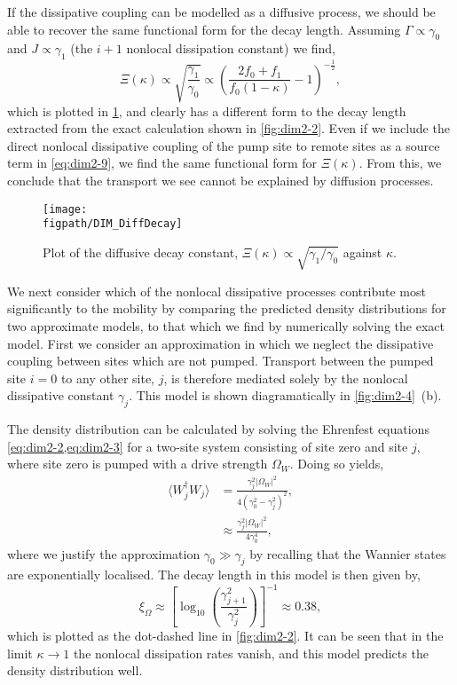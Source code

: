 If the dissipative coupling can be modelled as a diffusive process, we should be able to recover the same functional form for the decay length. Assuming \(\Gamma \propto \gamma_{0}\) and \(J \propto \gamma_{1}\) (the \(i+1\) nonlocal dissipation constant) we find,
\begin{equation}
	\Xi(\kappa) \propto \sqrt{\frac{\gamma_{1}}{\gamma_{0}}} \propto \left(\frac{2f_{0} + f_{1}}{f_{0}(1-\kappa)} - 1\right)^{-\frac{1}{2}},
	\label{eq:dim2-11}
\end{equation}
which is plotted in \cref{fig:dim2-5}, and clearly has a different form to the decay length extracted from the exact calculation shown in \cref{fig:dim2-2}. Even if we include the direct nonlocal dissipative coupling of the pump site to remote sites as a source term in \cref{eq:dim2-9}, we find the same functional form for \(\Xi(\kappa)\). From this, we conclude that the transport we see cannot be explained by diffusion processes.

\begin{figure}[ht!]
\centering 
\texttt{[image: \\figpath/DIM\_DiffDecay]}
\caption{\label{fig:dim2-5}Plot of the diffusive decay constant, \(\Xi(\kappa) \propto \sqrt{\gamma_{1}/\gamma_{0}}\) against \(\kappa\).}
\end{figure}

We next consider which of the nonlocal dissipative processes contribute most significantly to the mobility by comparing the predicted density distributions for two approximate models, to that which we find by numerically solving the exact model. First we consider an approximation in which we neglect the dissipative coupling between sites which are not pumped. Transport between the pumped site \(i=0\) to any other site, \(j\), is therefore mediated solely by the nonlocal dissipative constant \(\gamma_{j}\). This model is shown diagramatically in \cref{fig:dim2-4}~(b). 

The density distribution can be calculated by solving the Ehrenfest equations \cref{eq:dim2-2,eq:dim2-3} for a two-site system consisting of site zero and site \(j\), where site zero is pumped with a drive strength \(\Omega_{W}\). Doing so yields,
\begin{align}
	\langle W_{j}^{\dagger}W_{j} \rangle &= \frac{\gamma_{j}^{2}|\Omega_{W}|^{2}}{4(\gamma_{0}^{2} - \gamma_{j}^{2})^{2}}, \label{eq:dim2-12} \\
	&\approx \frac{\gamma_{j}^{2}|\Omega_{W}|^{2}}{4\gamma_{0}^{4}}, \label{eq:dim2-13}
\end{align}
where we justify the approximation \(\gamma_{0} \gg \gamma_{j}\) by recalling that the Wannier states are exponentially localised. The decay length in this model is then given by,
\begin{equation}
	\xi_{\Omega} \approx \left[ \log_{10}\left(\frac{\gamma_{j+1}^{2}}{\gamma_{j}^{2}}\right)\right]^{-1} \approx 0.38,
	\label{eq:dim2-14}
\end{equation}
which is plotted as the dot-dashed line in \cref{fig:dim2-2}. It can be seen that in the limit \(\kappa \rightarrow 1\) the nonlocal dissipation rates vanish, and this model predicts the density distribution well.

